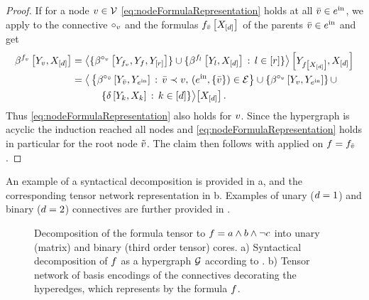 \begin{proof}
    If for a node $v\in\mathcal{V}$ \eqref{eq:nodeFormulaRepresentation} holds at all $\bar{v}\in e^{\mathrm{in}}$, we apply  to the connective $\circ_{v}$ and the formulas $f_{\bar{v}}\left[X_{[d]}\right]$ of the parents $\bar{v}\in e^{\mathrm{in}}$ and get
    \begin{align*}
        \beta^{f_{v}}\left[Y_{v},X_{[d]}\right]
        &= \left\langle 
            \{\beta^{\circ_{v}}\left[Y_{f_{v}},Y_{f},Y_{[r]}\right]\}
            \cup \{\beta^{f_{l}}\left[Y_{l},X_{[d]}\right] \,:\, l\in[r] \}
        \right\rangle \left[ Y_{f\left[X_{[d]}\right]},X_{[d]} \right] \\
        & = \big\langle 
            \left\{
            \beta^{\circ_{\bar{v}}}\left[Y_{\bar{v}},Y_{e^{\mathrm{in}}}\right] \,:\, \bar{v}\prec v ,\, (e^{\mathrm{in}},\{\bar{v}\})\in\mathcal{E}
            \right\} \cup \left\{\beta^{\circ_{v}}\left[Y_{v},Y_{e^{\mathrm{in}}}\right]\right\} \cup \\
            & \quad\quad\quad \{\delta\left[Y_{k},X_{k}\right] \,:\, k\in[d]\}
         \big\rangle \big[ X_{[d]} \big] \, .
    \end{align*}
    Thus \eqref{eq:nodeFormulaRepresentation} also holds for $v$.
    Since the hypergraph is acyclic the induction reached all nodes and \eqref{eq:nodeFormulaRepresentation} holds in particular for the root node $\tilde{v}$.
    The claim then follows with  applied on $f=f_{\tilde{v}}$.
\end{proof}

An example of a syntactical decomposition is provided in a, and the corresponding tensor network representation in b.
Examples of unary ($d=1$) and binary ($d=2$) connectives are further provided in .

\begin{figure}[t]
    \begin{center}
        
    \end{center}
    \caption{Decomposition of the formula tensor to $f = a \land b \land \lnot c$ into unary (matrix) and binary (third order tensor) cores.
    a) Syntactical decomposition of $f$ as a hypergraph $\mathcal{G}$ according to .
    b) Tensor network of basis encodings of the connectives decorating the hyperedges, which represents by  the formula $f$.
    }
    \label{fig:decompositionExample}
\end{figure}


